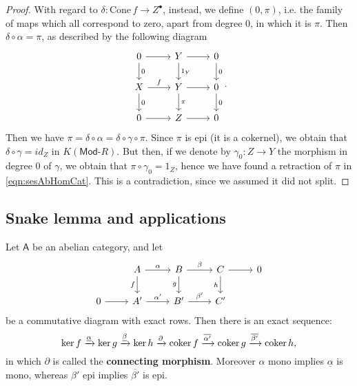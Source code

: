 \begin{proof}
	With regard to $\delta: \mathrm{Cone}\, f \to Z^\bullet$, instead, we define $(0, \pi)$, i.e.
	the family of maps which all correspond to zero, apart from degree $0$, in which it is $\pi$.
	Then $\delta \circ \alpha = \pi$, as described by the following diagram
	\begin{equation}
	\begin{tikzcd}
		0 \arrow[r, "", rightarrow] \arrow[d, "0", rightarrow] &
		Y \arrow[r, "", rightarrow] \arrow[d, "1_Y", rightarrow] &
		0 \arrow[d, "0", rightarrow] \\
		X \arrow[r, "f", rightarrow] \arrow[d, "0", rightarrow] &
		Y \arrow[r, "", rightarrow] \arrow[d, "\pi", rightarrow] &
		0 \arrow[d, "0", rightarrow] \\
		0 \arrow[r, "", rightarrow] &
		Z \arrow[r, "", rightarrow] &
		0
	\end{tikzcd}
	.\end{equation} 
	Then we have $\pi = \delta \circ \alpha = \delta \circ \gamma \circ \pi$.
	Since $\pi$ is epi (it is a cokernel), we obtain that
	$\delta \circ \gamma = id_Z$ in $K(\mathsf{Mod}\text{-}R)$.
	But then, if we denote by $\gamma_0: Z \to Y$ the morphism in degree $0$ of $\gamma$, we obtain
	that $\pi \circ \gamma_0 = 1_Z$, hence we have found a retraction of $\pi$ in \eqref{eqn:sesAbHomCat}.
	This is a contradiction, since we assumed it did not split.
\end{proof}

\subsection{Snake lemma and applications}
\begin{lem}
	Let $\mathsf{A}$ be an abelian category, and let
	\begin{equation}
	\begin{tikzcd}
		&
		A \arrow[r, "\alpha", rightarrow] \arrow[d, "f"', rightarrow] &
		B \arrow[r, "\beta", rightarrow] \arrow[d, "g"', rightarrow] &
		C \arrow[r, "", rightarrow] \arrow[d, "h"', rightarrow] &
		0 \\
		0 \arrow[r, "", rightarrow] &
		A' \arrow[r, "\alpha'", rightarrow] &
		B' \arrow[r, "\beta'", rightarrow] &
		C' &
	\end{tikzcd}
	\end{equation} 
	be a commutative diagram with exact rows.
	Then there is an exact sequence:
	\begin{equation}
	\ker f \xrightarrow{\underline{\alpha}} \ker g \xrightarrow{\underline{\beta}}
	\ker h \xrightarrow{\partial} \operatorname{coker} f \xrightarrow{\overline{\alpha'}} 
	\operatorname{coker} g \xrightarrow{\overline{\beta'}} \operatorname{coker} h
	,\end{equation} 
	in which $\partial$ is called the \textbf{connecting morphism}.
	Moreover $\alpha$ mono implies $\underline{\alpha}$ is mono,
	whereas $\beta'$ epi implies $\overline{\beta'}$ is epi.
\end{lem} 	


